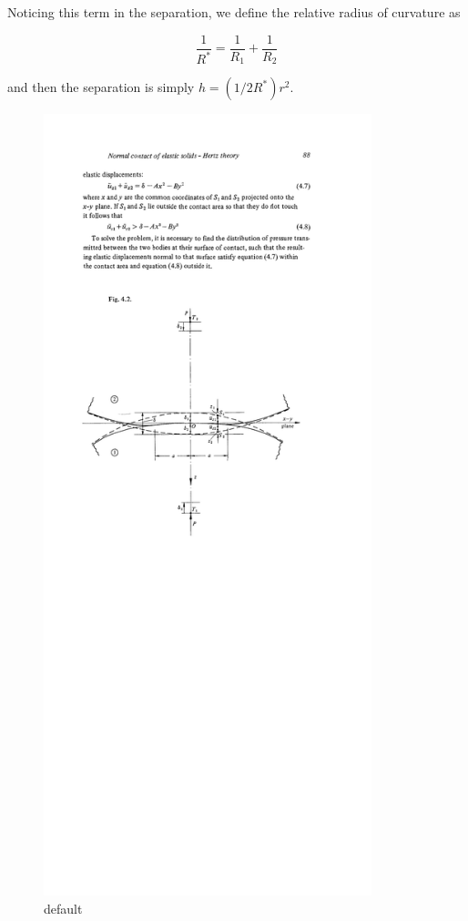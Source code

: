 Noticing this term in the separation, we define the relative radius of curvature as

\begin{equation}\label{eq:relativeRadius}
\frac{1}{R^*} = \frac{1}{R_1} + \frac{1}{R_2}
\end{equation}

and then the separation is simply $h = (1/2R^*)r^2$.

\begin{figure}[ht!]
	\begin{center}
	\includegraphics[width=0.85\textwidth]{chapters/figures/hertzGeometry}
	\caption{default}
	\label{fig:hertzgeometry}
	\end{center}
\end{figure}

